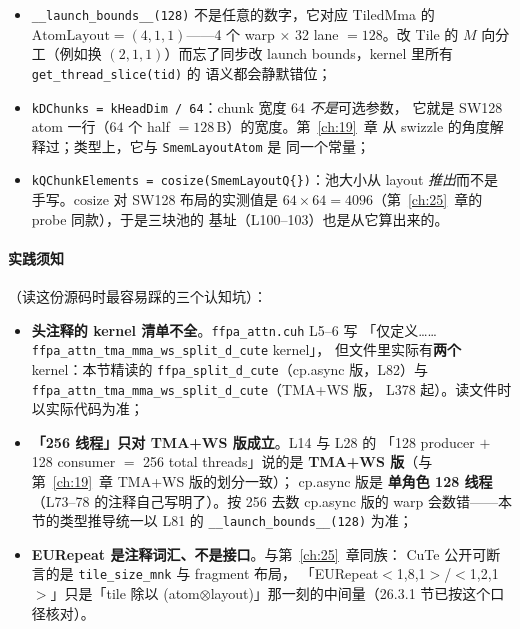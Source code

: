 \begin{itemize}[itemsep=2pt,topsep=2pt]
  \item \texttt{\_\allowbreak{}\_\allowbreak{}launch\_\allowbreak{}bounds\_\allowbreak{}\_\allowbreak{}(128)} 不是任意的数字，它对应
        TiledMma 的 $\mathrm{AtomLayout}=(4,1,1)$——4 个 warp $\times$ 32 lane
        $=128$。改 Tile 的 $M$ 向分工（例如换 $(2,1,1)$）而忘了同步改
        launch bounds，kernel 里所有 \texttt{get\_\allowbreak{}thread\_\allowbreak{}slice(tid)} 的
        语义都会静默错位；
  \item \texttt{kDChunks = kHeadDim / 64}：chunk 宽度 64 \emph{不是}可选参数，
        它就是 SW128 atom 一行（$64$ 个 half $=128$\,B）的宽度。第~\ref{ch:19}~章
        从 swizzle 的角度解释过；类型上，它与 \texttt{Smem\allowbreak{}Layout\allowbreak{}Atom} 是
        同一个常量；
  \item \texttt{k\allowbreak{}QChunk\allowbreak{}Elements =\allowbreak{} cosize\allowbreak{}(Smem\allowbreak{}Layout\allowbreak{}Q\{\})}：池大小从 layout
        \emph{推出}而不是手写。$\mathrm{cosize}$ 对 SW128 布局的实测值是
        $64\times64=4096$（第~\ref{ch:25}~章的 probe 同款），于是三块池的
        基址（L100--103）也是从它算出来的。
\end{itemize}

\paragraph{实践须知}（读这份源码时最容易踩的三个认知坑）：

\begin{itemize}[itemsep=2pt,topsep=2pt]
  \item \textbf{头注释的 kernel 清单不全}。\texttt{ffpa\_\allowbreak{}attn.\allowbreak{}cuh} L5--6 写
        「仅定义……\texttt{ffpa\_\allowbreak{}attn\_\allowbreak{}tma\_\allowbreak{}mma\_\allowbreak{}ws\_\allowbreak{}split\_\allowbreak{}d\_\allowbreak{}cute} kernel」，
        但文件里实际有\textbf{两个} kernel：本节精读的
        \texttt{ffpa\_\allowbreak{}split\_\allowbreak{}d\_\allowbreak{}cute}（cp.async 版，L82）与
        \texttt{ffpa\_\allowbreak{}attn\_\allowbreak{}tma\_\allowbreak{}mma\_\allowbreak{}ws\_\allowbreak{}split\_\allowbreak{}d\_\allowbreak{}cute}（TMA+WS 版，
        L378 起）。读文件时以实际代码为准；
  \item \textbf{「256 线程」只对 TMA+WS 版成立}。L14 与 L28 的
        「128 producer $+$ 128 consumer $=$ 256 total threads」说的是
        \textbf{TMA+WS 版}（与第~\ref{ch:19}~章 TMA+WS 版的划分一致）；
        cp.async 版是
        \textbf{单角色 128 线程}（L73--78 的注释自己写明了）。按 256 去数
        cp.async 版的 warp 会数错——本节的类型推导统一以 L81 的
        \texttt{\_\allowbreak{}\_\allowbreak{}launch\_\allowbreak{}bounds\_\allowbreak{}\_\allowbreak{}(128)} 为准；
  \item \textbf{EURepeat 是注释词汇、不是接口}。与第~\ref{ch:25}~章同族：
        CuTe 公开可断言的是 \texttt{tile\_\allowbreak{}size\_\allowbreak{}mnk} 与 fragment 布局，
        「EURepeat$<$1,8,1$>$/$<$1,2,1$>$」只是「tile 除以
        (atom$\otimes$layout)」那一刻的中间量（26.3.1 节已按这个口径核对）。
\end{itemize}

